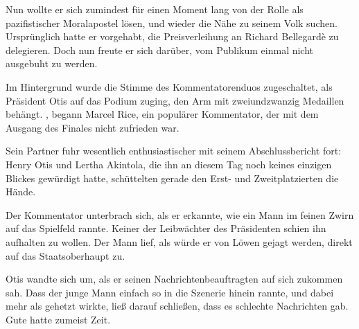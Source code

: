 \par

Nun wollte er sich zumindest für einen Moment lang von der Rolle als pazifistischer Moralapostel lösen, und wieder die Nähe zu seinem Volk suchen. Ursprünglich hatte er vorgehabt, die Preisverleihung an Richard Bellegardè zu delegieren. Doch nun freute er sich darüber, vom Publikum einmal nicht ausgebuht zu werden.

\par

Im Hintergrund wurde die Stimme des Kommentatorenduos zugeschaltet, als Präsident Otis auf das Podium zuging, den Arm mit zweiundzwanzig Medaillen behängt. , begann Marcel Rice, ein populärer Kommentator, der mit dem Ausgang des Finales nicht zufrieden war. 

\par

Sein Partner fuhr wesentlich enthusiastischer mit seinem Abschlussbericht fort:  Henry Otis und Lertha Akintola, die ihn an diesem Tag noch keines einzigen Blickes gewürdigt hatte, schüttelten gerade den Erst- und Zweitplatzierten die Hände. 

\par

Der Kommentator unterbrach sich, als er erkannte, wie ein Mann im feinen Zwirn auf das Spielfeld rannte. Keiner der Leibwächter des Präsidenten schien ihn aufhalten zu wollen. Der Mann lief, als würde er von Löwen gejagt werden, direkt auf das Staatsoberhaupt zu.

\par

Otis wandte sich um, als er seinen Nachrichtenbeauftragten auf sich zukommen sah. Dass der junge Mann einfach so in die Szenerie hinein rannte, und dabei mehr als gehetzt wirkte, ließ darauf schließen, dass es schlechte Nachrichten gab. Gute hatte zumeist Zeit.


